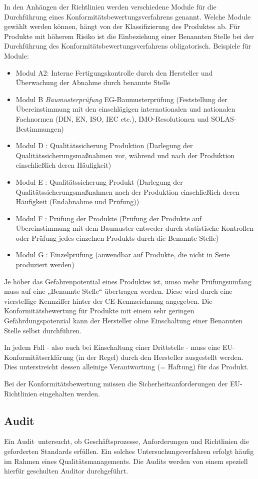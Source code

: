 In den Anhängen der Richtlinien werden verschiedene Module für die Durchführung eines Konformitätsbewertungsverfahrens genannt. Welche Module gewählt werden können, hängt von der Klassifizierung des Produktes ab. Für Produkte mit höherem Risiko ist die Einbeziehung einer Benannten Stelle bei der Durchführung des Konformitätsbewertungsverfahrens obligatorisch.
Beispiele für Module:
\begin{itemize}
\item Modul A2: Interne Fertigungskontrolle durch den Hersteller und Überwachung der Abnahme durch benannte Stelle 
\item Modul B \textit{Baumusterprüfung}
EG-Baumusterprüfung (Feststellung der Übereinstimmung mit den einschlägigen internationalen und nationalen Fachnormen (DIN, EN, ISO, IEC etc.), IMO-Resolutionen und SOLAS-Bestimmungen)
\item Modul D
: Qualitätssicherung Produktion (Darlegung der Qualitätssicherungsmaßnahmen vor, während und nach der Produktion einschließlich deren Häufigkeit)
\item Modul E
: Qualitätssicherung Produkt (Darlegung der Qualitätssicherungsmaßnahmen nach der Produktion einschließlich deren Häufigkeit (Endabnahme und Prüfung))
\item Modul F
: Prüfung der Produkte (Prüfung der Produkte auf Übereinstimmung mit dem Baumuster entweder durch statistische Kontrollen oder Prüfung jedes einzelnen Produkts durch die Benannte Stelle)
\item Modul G
: Einzelprüfung (anwendbar auf Produkte, die nicht in Serie produziert werden)
\end{itemize}
Je höher das Gefahrenpotential eines Produktes ist, umso mehr Prüfungsumfang muss auf eine „Benannte Stelle“ übertragen werden. Diese wird durch eine vierstellige Kennziffer hinter der CE-Kennzeichnung angegeben. Die Konformitätsbewertung für Produkte mit einem sehr geringen Gefährdungspotenzial kann der Hersteller ohne Einschaltung einer Benannten Stelle selbst durchführen.

In jedem Fall - also auch bei Einschaltung einer Drittstelle - muss eine EU-Konformitätserklärung (in der Regel) durch den Hersteller ausgestellt werden. Dies unterstreicht dessen alleinige Verantwortung (= Haftung) für das Produkt.

Bei der Konformitätsbewertung müssen die Sicherheitsanforderungen der EU-Richtlinien eingehalten werden. 

\subsection{Audit}
Ein \glqq Audit\grqq~untersucht, ob Geschäftsprozesse, Anforderungen und Richtlinien die geforderten Standards erfüllen. Ein solches Untersuchungsverfahren erfolgt häufig im Rahmen eines Qualitätsmanagements. Die Audits werden von einem speziell hierfür geschulten Auditor durchgeführt.


